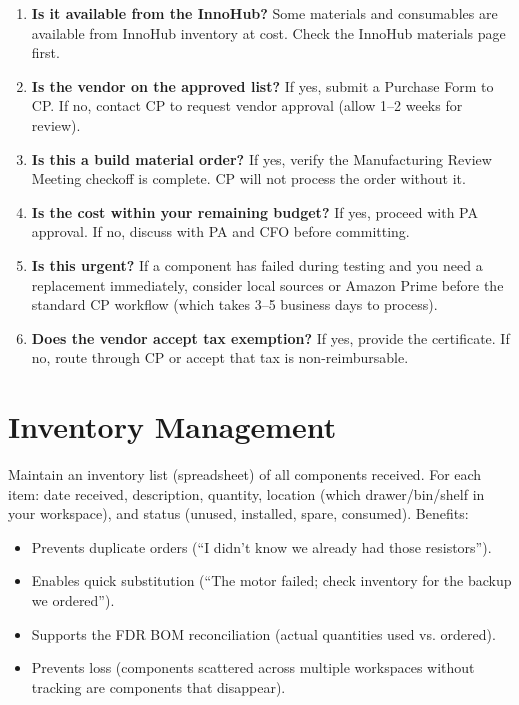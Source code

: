 \begin{enumerate}[nosep,leftmargin=1.5em]
\item \textbf{Is it available from the InnoHub?} Some materials and consumables are available from InnoHub inventory at cost. Check the InnoHub materials page first.
\item \textbf{Is the vendor on the approved list?} If yes, submit a Purchase Form to CP. If no, contact CP to request vendor approval (allow 1--2 weeks for review).
\item \textbf{Is this a build material order?} If yes, verify the Manufacturing Review Meeting checkoff is complete. CP will not process the order without it.
\item \textbf{Is the cost within your remaining budget?} If yes, proceed with PA approval. If no, discuss with PA and CFO before committing.
\item \textbf{Is this urgent?} If a component has failed during testing and you need a replacement immediately, consider local sources or Amazon Prime before the standard CP workflow (which takes 3--5 business days to process).
\item \textbf{Does the vendor accept tax exemption?} If yes, provide the certificate. If no, route through CP or accept that tax is non-reimbursable.
\end{enumerate}

\section{Inventory Management}
Maintain an inventory list (spreadsheet) of all components received. For each item: date received, description, quantity, location (which drawer/bin/shelf in your workspace), and status (unused, installed, spare, consumed). Benefits:

\begin{itemize}[nosep,leftmargin=1.5em]
\item Prevents duplicate orders (``I didn't know we already had those resistors'').
\item Enables quick substitution (``The motor failed; check inventory for the backup we ordered'').
\item Supports the FDR BOM reconciliation (actual quantities used vs. ordered).
\item Prevents loss (components scattered across multiple workspaces without tracking are components that disappear).
\end{itemize}



